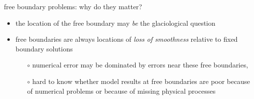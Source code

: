 \begin{frame}{free boundary problems: why do they matter?}
\begin{itemize}
\item the location of the free boundary may \emph{be} the glaciological question
\item free boundaries are always locations of \emph{loss of smoothness} relative to fixed boundary solutions
     \begin{itemize}
     \item[$\circ$] numerical error may be dominated by errors near these free boundaries, 
     \item[$\circ$] hard to know whether model results at free boundaries are poor because of numerical problems or because of missing physical processes
     \end{itemize}
\end{itemize}
\end{frame}